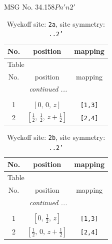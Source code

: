 \documentclass[fleqn,8pt]{jsarticle}
\begin{document}
\setcounter{MaxMatrixCols}{32}

\renewcommand{\tablename}{Table~}
\renewcommand{\figurename}{Figure~}
\begin{center}
\LARGE
MSG No. 34.158\quad$Pn'n2'$
\end{center}
\renewcommand{\arraystretch}{1.2}
\begin{longtable}{ccc}
\caption{Wyckoff site: {\tt 2a}, site symmetry: {\tt ..2'}}
 \\
 \hline \hline
No. & position & mapping \\ \hline \endfirsthead

\multicolumn{2}{l}{\tablename\ \thetable{}} \\
 \hline \hline
No. & position & mapping \\ \hline \endhead

 \hline \hline
\multicolumn{2}{r}{\footnotesize\it continued ...} \\ \endfoot

 \hline \hline
\multicolumn{2}{r}{} \\ \endlastfoot

1 & $\left[ 0,\, 0,\, z \right]$ & {\tt [1,3]} \\ \hline
2 & $\left[ \frac{1}{2},\, \frac{1}{2},\, z + \frac{1}{2} \right]$ & {\tt [2,4]} \\
\end{longtable}
\renewcommand{\arraystretch}{1.2}
\begin{longtable}{ccc}
\caption{Wyckoff site: {\tt 2b}, site symmetry: {\tt ..2'}}
 \\
 \hline \hline
No. & position & mapping \\ \hline \endfirsthead

\multicolumn{2}{l}{\tablename\ \thetable{}} \\
 \hline \hline
No. & position & mapping \\ \hline \endhead

 \hline \hline
\multicolumn{2}{r}{\footnotesize\it continued ...} \\ \endfoot

 \hline \hline
\multicolumn{2}{r}{} \\ \endlastfoot

1 & $\left[ 0,\, \frac{1}{2},\, z \right]$ & {\tt [1,3]} \\ \hline
2 & $\left[ \frac{1}{2},\, 0,\, z + \frac{1}{2} \right]$ & {\tt [2,4]} \\
\end{longtable}
\end{document}
